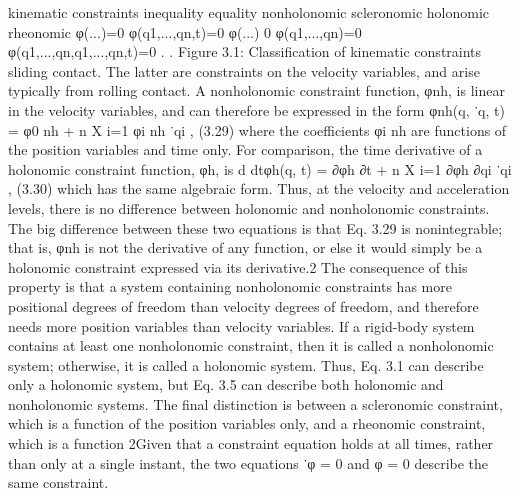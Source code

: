 kinematic constraints inequality equality nonholonomic scleronomic holonomic rheonomic φ(...)=0 φ(q1,...,qn,t)=0 φ(...) 0 φ(q1,...,qn)=0 φ(q1,...,qn,q1,...,qn,t)=0 . . Figure 3.1: Classification of kinematic constraints sliding contact. The latter are constraints on the velocity variables, and arise typically from rolling contact. A nonholonomic constraint function, φnh, is linear in the velocity variables, and can therefore be expressed in the form φnh(q, ˙q, t) = φ0 nh + n X i=1 φi nh ˙qi , (3.29) where the coefficients φi nh are functions of the position variables and time only. For comparison, the time derivative of a holonomic constraint function, φh, is d dtφh(q, t) = ∂φh ∂t + n X i=1 ∂φh ∂qi ˙qi , (3.30) which has the same algebraic form. Thus, at the velocity and acceleration levels, there is no difference between holonomic and nonholonomic constraints. The big difference between these two equations is that Eq. 3.29 is nonintegrable; that is, φnh is not the derivative of any function, or else it would simply be a holonomic constraint expressed via its derivative.2 The consequence of this property is that a system containing nonholonomic constraints has more positional degrees of freedom than velocity degrees of freedom, and therefore needs more position variables than velocity variables. If a rigid-body system contains at least one nonholonomic constraint, then it is called a nonholonomic system; otherwise, it is called a holonomic system. Thus, Eq. 3.1 can describe only a holonomic system, but Eq. 3.5 can describe both holonomic and nonholonomic systems. The final distinction is between a scleronomic constraint, which is a function of the position variables only, and a rheonomic constraint, which is a function 2Given that a constraint equation holds at all times, rather than only at a single instant, the two equations ˙φ = 0 and φ = 0 describe the same constraint.

